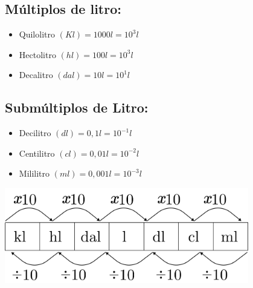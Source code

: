 \begin{multicols}{2}
	\subsection{Múltiplos de litro:}
		\begin{itemize}
		    \item Quilolitro $(Kl) = 1000 l = 10^3 l$
		    \item Hectolitro $(hl) = 100 l = 10^3 l$
		    \item Decalitro $(dal) = 10 l = 10^1l$
		\end{itemize}

	\subsection{Submúltiplos de Litro:}
		\begin{itemize}
		    \item Decilitro $(dl) = 0,1 l = 10^{-1}l$
		    \item Centilitro $(cl) = 0,01 l = 10^{-2}l$
		    \item Mililitro $(ml) = 0,001 l = 10^{-3}l$
		\end{itemize}
\columnbreak    
     \bigskip
     \noindent   
     \begin{minipage}{\linewidth}
    \centering 
    \includegraphics[width=0.8\textwidth]{imagens/matematicaBasica/sistemaDeUnidades/MultiplosDeLitro.pdf}
     \end{minipage}
   \end{multicols}  
